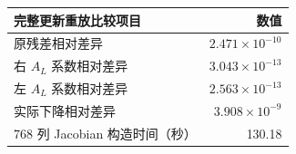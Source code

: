 \begin{tabular}{lr}
\toprule
完整更新重放比较项目 & 数值 \\
\midrule
原残差相对差异 & $2.471\times10^{-10}$ \\
右 $A_L$ 系数相对差异 & $3.043\times10^{-13}$ \\
左 $A_L$ 系数相对差异 & $2.563\times10^{-13}$ \\
实际下降相对差异 & $3.908\times10^{-9}$ \\
768 列 Jacobian 构造时间（秒） & 130.18 \\
\bottomrule
\end{tabular}
